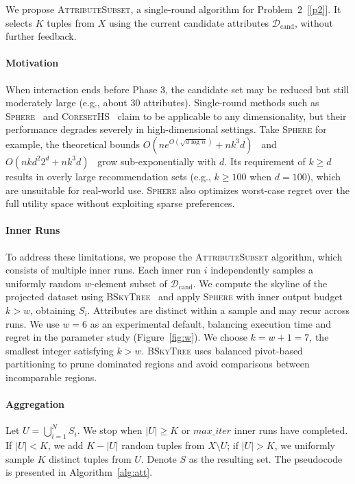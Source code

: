 \documentclass[conference]{IEEEtran}
\theoremstyle{definition}
\theoremstyle{plain}
\begin{document}
We propose \textsc{AttributeSubset}, a single-round algorithm for Problem~2~[\ref{p2}]. It selects $K$ tuples from $X$ using the current candidate attributes $\mathcal{D}_\text{cand}$, without further feedback.

\paragraph{\textbf{Motivation}}
When interaction ends before Phase 3, the candidate set may be reduced but still moderately large (e.g., about $30$ attributes). Single-round methods such as \textsc{Sphere}~\cite{XW18} and \textsc{CoresetHS}~\cite{kumar2018faster} claim to be applicable to any dimensionality, but their performance degrades severely in high-dimensional settings. Take \textsc{Sphere} for example, the theoretical bounds $O(n e^{O(\sqrt{d \log n})} + nk^3d)$~\cite{Gar95} and $O(nkd^2 2^d + nk^3d)$~\cite{SW92} grow sub-exponentially with $d$. Its requirement of $k\geq d$ results in overly large recommendation sets (e.g., $k \ge 100$ when $d = 100$), which are unsuitable for real-world use. \textsc{Sphere} also optimizes worst-case regret over the full utility space without exploiting sparse preferences.

\paragraph{\textbf{Inner Runs}}
To address these limitations, we propose the \textsc{AttributeSubset} algorithm, which consists of multiple inner runs. Each inner run $i$ independently samples a uniformly random $w$-element subset of $\mathcal{D}_\text{cand}$. We compute the skyline of the projected dataset using \textsc{BSkyTree}~\cite{bskytree} and apply \textsc{Sphere} with inner output budget $k>w$, obtaining $S_i$. Attributes are distinct within a sample and may recur across runs. We use $w=6$ as an experimental default, balancing execution time and regret in the parameter study (Figure~\ref{fig:w}). We choose $k=w+1=7$, the smallest integer satisfying $k>w$. \textsc{BSkyTree} uses balanced pivot-based partitioning to prune dominated regions and avoid comparisons between incomparable regions.

\paragraph{\textbf{Aggregation}}
Let $U=\bigcup_{i=1}^{N}S_i$. We stop when $\lvert U\rvert\geq K$ or $max\_iter$ inner runs have completed. If $\lvert U\rvert<K$, we add $K-\lvert U\rvert$ random tuples from $X\setminus U$; if $\lvert U\rvert>K$, we uniformly sample $K$ distinct tuples from $U$. Denote $S$ as the resulting set. The pseudocode is presented in Algorithm~\ref{alg:att}.
\end{document}
